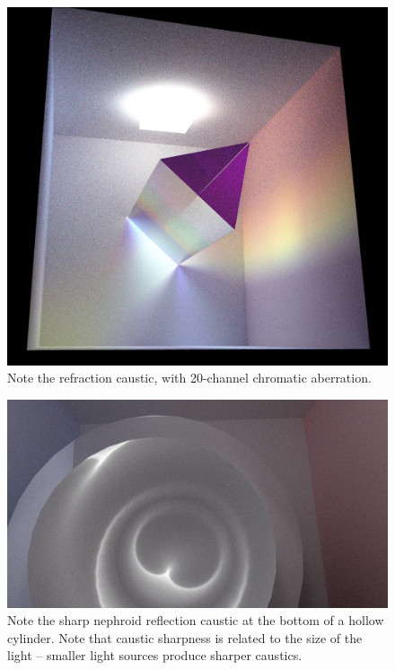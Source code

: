 \documentclass[12pt]{article}
\begin{document}
\begin{figure} 
\centering
  \includegraphics[width = 6 in]{v_rt_reflect_prism3.png}
  \caption{ Note the refraction caustic, with 20-channel chromatic aberration.
}
\end{figure}


\begin{figure} 
\centering
  \includegraphics[width = 6 in]{sharp_caustic.png}
  \caption{ Note the sharp nephroid reflection caustic at the bottom of a hollow cylinder.
Note that caustic sharpness is related to the size of the light -- smaller light sources produce sharper caustics.
}
\end{figure}
\end{document}
